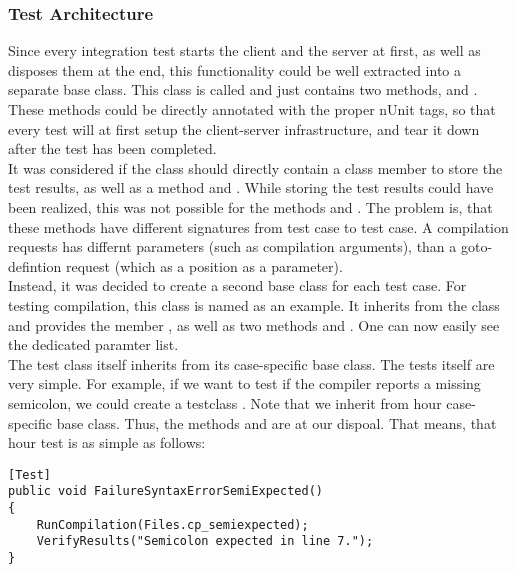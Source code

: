 \subsubsection{Test Architecture}
Since every integration test starts the client and the server at first, as well as disposes them at the end, this functionality could be well extracted into a separate base class. This class is called  and just contains two methods,  and . These methods could be directly annotated with the proper nUnit tags, so that every test will at first setup the client-server infrastructure, and tear it down after the test has been completed.\\
It was considered if the  class should directly contain a class member\linebreak {} to store the test results, as well as a method  and . While storing the test results could have been realized, this was not possible for the methods  and . The problem is, that these methods have different signatures from test case to test case. A compilation requests has differnt parameters (such as compilation arguments), than a goto-defintion request (which as a position as a parameter).\\
Instead, it was decided to create a second base class for each test case. For testing compilation, this class is named  as an example. It inherits from the  class and provides the member , as well as two methods  and . One can now easily see the dedicated paramter list.\\
The test class itself inherits from its case-specific base class. The tests itself are very simple. For example, if we want to test if the compiler reports a missing semicolon, we could create a testclass . Note that we inherit from hour case-specific base class. Thus, the methods  and are at our dispoal. That means, that hour test is as simple as follows:
\begin{lstlisting}[caption={Sample Test for Missing Semicolon}, captionpos=b, label={lst:demoTest}]
[Test]
public void FailureSyntaxErrorSemiExpected()
{
    RunCompilation(Files.cp_semiexpected);
    VerifyResults("Semicolon expected in line 7.");
}
\end{lstlisting}
